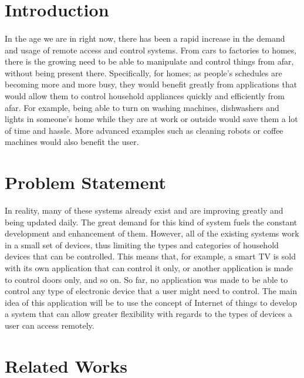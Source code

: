 \documentclass[12pt]{paper}
\begin{document}
		\section{Introduction}
		\paragraph{} 	In the age we are in right now, there has been a rapid increase in the demand and usage of remote access and control systems. From cars to factories to homes, there is the growing need to be able to manipulate and control things from afar, without being present there. Specifically, for homes; as people’s schedules are becoming more and more busy, they would benefit greatly from applications that would allow them to control household appliances quickly and efficiently from afar. For example, being able to turn on washing machines, dishwashers and lights in someone’s home while they are at work or outside would save them a lot of time and hassle. More advanced examples such as cleaning robots or coffee machines would also benefit the user.
		
		
		\section{Problem Statement}
		In reality, many of these systems already exist and are improving greatly and being updated daily. The great demand for this kind of system fuels the constant development and enhancement of them. However, all of the existing systems work in a small set of devices, thus limiting the types and categories of household devices that can be controlled. This means that, for example, a smart TV is sold with its own application that can control it only, or another application is made to control doors only, and so on. So far, no application was made to be able to control any type of electronic device that a user might need to control. The main idea of this application will be to use the concept of Internet of things to develop a system that can allow greater flexibility with regards to the types of devices a user can access remotely.
		
		\section{Related Works}
\end{document}
